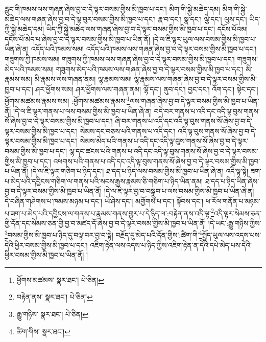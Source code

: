 རླུང་གི་ཁམས་ལས་གཞན་ཞེས་བྱ་བ་དེ་ལྟར་བསམ་གྱིས་མི་ཁྱབ་པ་དང་། མིག་གི་སྐྱེ་མཆེད་དམ། མིག་གི་སྐྱེ་མཆེད་ལས་གཞན་ཞེས་བྱ་བ་དེ་ལྟ་བུར་བསམ་གྱིས་མི་ཁྱབ་པ་དང་། རྣ་བ་དང་། སྣ་དང་། ལྕེ་དང་། ལུས་དང་། ཡིད་ཀྱི་སྐྱེ་མཆེད་དམ། ཡིད་ཀྱི་སྐྱེ་མཆེད་ལས་གཞན་ཞེས་བྱ་བ་དེ་ལྟར་བསམ་གྱིས་མི་ཁྱབ་པ་དང་། དངོས་པོའམ། དངོས་པོ་མེད་པ་ཞེས་བྱ་བ་དེ་ལྟར་བསམ་གྱིས་མི་ཁྱབ་པ་ཡིན་ནོ། །དེ་ལ་ཇི་ལྟར་ཡུལ་ལས་བསམ་གྱིས་མི་ཁྱབ་པ་ཡིན་ཞེ་ན། འདོད་པའི་ཁམས་སམ། འདོད་པའི་ཁམས་ལས་གཞན་ཞེས་བྱ་བ་དེ་ལྟར་བསམ་གྱིས་མི་ཁྱབ་པ་དང་། གཟུགས་ཀྱི་ཁམས་སམ། གཟུགས་ཀྱི་ཁམས་ལས་གཞན་ཞེས་བྱ་བ་དེ་ལྟར་བསམ་གྱིས་མི་ཁྱབ་པ་དང་། གཟུགས་མེད་པའི་ཁམས་སམ། གཟུགས་མེད་པའི་ཁམས་ལས་གཞན་ཞེས་བྱ་བ་དེ་ལྟར་བསམ་གྱིས་མི་ཁྱབ་པ་དང་། མི་རྣམས་སམ། མི་རྣམས་ལས་གཞན་ནམ། ལྷ་རྣམས་སམ། ལྷ་རྣམས་ལས་གཞན་ཞེས་བྱ་བ་དེ་ལྟར་བསམ་གྱིས་མི་ཁྱབ་པ་དང་། ཤར་ཕྱོགས་སམ། ཤར་ཕྱོགས་ལས་གཞན་ནམ། ལྷོ་དང་། ནུབ་དང་། བྱང་དང་། འོག་དང་། སྟེང་དང་། ཕྱོགས་མཚམས་རྣམས་སམ། :ཕྱོགས་མཚམས་རྣམས་\footnote{ཕྱོགས་མཚམས་  སྣར་ཐང་།  པེ་ཅིན། }ལས་གཞན་ཞེས་བྱ་བ་དེ་ལྟར་བསམ་གྱིས་མི་ཁྱབ་པ་ཡིན་ནོ། །དེ་ལ་ཇི་ལྟར་གནས་པ་ལས་བསམ་གྱིས་མི་ཁྱབ་པ་ཡིན་ཞེ་ན། བདེ་བར་གནས་པ་འདི་དང་འདི་ལྟ་བུས་གནས་སོ་ཞེས་བྱ་བ་དེ་ལྟར་བསམ་གྱིས་མི་ཁྱབ་པ་དང་། ཞི་བར་གནས་པ་འདི་དང་འདི་ལྟ་བུས་གནས་སོ་ཞེས་བྱ་བ་དེ་ལྟར་བསམ་གྱིས་མི་ཁྱབ་པ་དང་། སེམས་དང་བཅས་པའི་གནས་པ་འདི་དང་། འདི་ལྟ་བུས་གནས་སོ་ཞེས་བྱ་བ་དེ་ལྟར་བསམ་གྱིས་མི་ཁྱབ་པ་དང་། སེམས་མེད་པའི་གནས་པ་འདི་དང་འདི་ལྟ་བུས་གནས་སོ་ཞེས་བྱ་བ་དེ་ལྟར་བསམ་གྱིས་མི་ཁྱབ་པ་དང་། ལྷ་དང་ཚངས་པའི་གནས་པ་འདི་དང་འདི་ལྟ་བུས་གནས་སོ་ཞེས་བྱ་བ་དེ་ལྟར་བསམ་གྱིས་མི་ཁྱབ་པ་དང་། འཕགས་པའི་གནས་པ་འདི་དང་འདི་ལྟ་བུས་གནས་སོ་ཞེས་བྱ་བ་དེ་ལྟར་བསམ་གྱིས་མི་ཁྱབ་པ་ཡིན་ནོ། །དེ་ལ་ཇི་ལྟར་གཅིག་པ་ཉིད་དང་། ཐ་དད་པ་ཉིད་ལས་བསམ་གྱིས་མི་ཁྱབ་པ་ཡིན་ཞེ་ན། འདི་ལྟ་སྟེ། ཟག་པ་མེད་པའི་དབྱིངས་གཅིག་ལ་གནས་པའི་སངས་རྒྱས་རྣམས་ཅི་གཅིག་པ་ཉིད་ཡིན་ནམ། ཐ་དད་པ་ཉིད་ཡིན་ཞེས་བྱ་བ་དེ་ལྟར་བསམ་གྱིས་མི་ཁྱབ་པ་ཡིན་ནོ། །དེ་ལ་ཇི་ལྟར་བྱ་བ་བསྒྲུབ་པ་ལས་བསམ་གྱིས་མི་ཁྱབ་པ་ཡིན་ཞེ་ན། དེ་བཞིན་གཤེགས་པ་ཁམས་མཉམ་པ་དང་། ཡེ་ཤེས་དང་། མགྱོགས་པ་དང་། སྟོབས་དང་། ཕ་རོལ་གནོན་པ་མཉམ་པ་ཟག་པ་མེད་པའི་དབྱིངས་ལ་གནས་པ་རྣམས་གནས་གྱུར་པ་དེ་ཉིད་ལ་:བརྟེན་ནས་འདི་ལྟ་\footnote{བརྟེན་ནས་  སྣར་ཐང་།  པེ་ཅིན། }འདི་ལྟར་སེམས་ཅན་གྱི་དོན་དང་སེམས་ཅན་གྱི་བྱ་བ་མཛད་དོ་ཞེས་བྱ་བ་དེ་ལྟར་བསམ་གྱིས་མི་ཁྱབ་པ་ཡིན་ནོ། །དེ་ཡང་:རྒྱུ་གཉིས་ཀྱིས་\footnote{རྒྱུ་གཉིས་  སྣར་ཐང་།  པེ་ཅིན། }བསམ་གྱིས་མི་ཁྱབ་པ་ཉིད་དུ་བལྟ་བར་བྱ་བ་སྟེ། བརྗོད་དུ་མེད་པའི་དོན་གྱིས་:ཚིག་གི་\footnote{ཚིག་གིས་  སྣར་ཐང་། }སྤྱོད་ཡུལ་ལས་འདས་པས་དེའི་ཕྱིར་བསམ་གྱིས་མི་ཁྱབ་པ་དང་། འཇིག་རྟེན་ལས་འདས་པ་ཉིད་ཀྱིས་འཇིག་རྟེན་ན་དེའི་དཔེ་མེད་པས་དེའི་ཕྱིར་བསམ་གྱིས་མི་ཁྱབ་པ་ཡིན་ནོ། །
